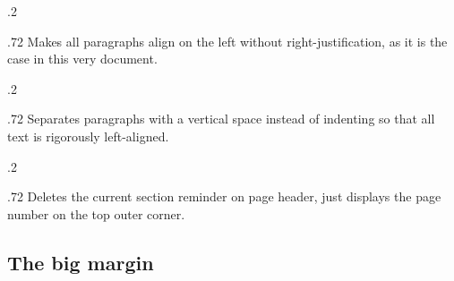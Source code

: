 \documentclass[raggedright, twoside, 11pt]{tufte-style-article}
\begin{document}
\medskip
\begin{minipagewithmarginpars}[t]{.2\textwidth}
	\raggedleft
\end{minipagewithmarginpars}\hfill%
\begin{minipagewithmarginpars}[t]{.72\textwidth}
	Makes all paragraphs align on the left without right-justification, as it is the case in this very document. \\
\end{minipagewithmarginpars}
\smallskip
\begin{minipagewithmarginpars}[t]{.2\textwidth}
	\raggedleft
\end{minipagewithmarginpars}\hfill%
\begin{minipagewithmarginpars}[t]{.72\textwidth}
	Separates paragraphs with a vertical space instead of indenting so that all text is rigorously left-aligned.
\end{minipagewithmarginpars}
\smallskip
\begin{minipagewithmarginpars}[t]{.2\textwidth}
	\raggedleft
\end{minipagewithmarginpars}\hfill%
\begin{minipagewithmarginpars}[t]{.72\textwidth}
	Deletes the current section reminder on page header, just displays the page number on the top outer corner.
\end{minipagewithmarginpars}



\subsection{The big margin}
\end{document}

